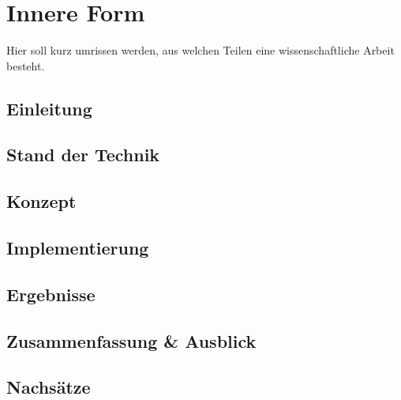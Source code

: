 \documentclass[a4paper, 11pt]{article}
\begin{document}
\pagebreak[4]
\section{Innere Form}

Hier soll kurz umrissen werden, aus welchen Teilen eine wissenschaftliche Arbeit besteht.

\subsection{Einleitung}


\subsection{Stand der Technik}


\subsection{Konzept}


\subsection{Implementierung}


\subsection{Ergebnisse}


\subsection{Zusammenfassung \& Ausblick}


\subsection{Nachsätze}


\printbibliography
\end{document}
